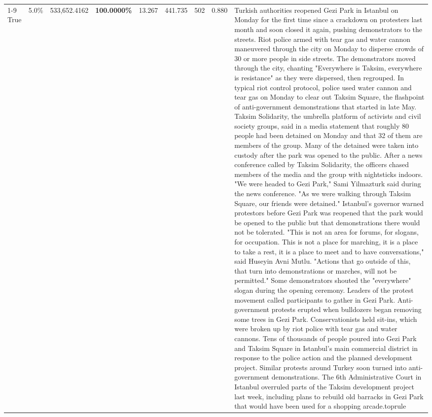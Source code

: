\begin{table}[H]
\begin{tabular}{lllrlllll}
\cline{1-9}
True & 5.0\% & 533,652.4162 & \bfseries \color{red} 100.0000\% & 13.267 & 441.735 & 502 & 0.880 & Turkish authorities reopened Gezi Park in Istanbul on Monday for the first time since a crackdown on protesters last month and soon closed it again, pushing demonstrators to the streets. Riot police armed with tear gas and water cannon maneuvered through the city on Monday to disperse crowds of 30 or more people in side streets. The demonstrators moved through the city, chanting "Everywhere is Taksim, everywhere is resistance" as they were dispersed, then regrouped. In typical riot control protocol, police used water cannon and tear gas on Monday to clear out Taksim Square, the flashpoint of anti-government demonstrations that started in late May. Taksim Solidarity, the umbrella platform of activists and civil society groups, said in a media statement that roughly 80 people had been detained on Monday and that 32 of them are members of the group. Many of the detained were taken into custody after the park was opened to the public. After a news conference called by Taksim Solidarity, the officers chased members of the media and the group with nightsticks indoors. "We were headed to Gezi Park," Sami Yilmazturk said during the news conference. "As we were walking through Taksim Square, our friends were detained." Istanbul's governor warned protestors before Gezi Park was reopened that the park would be opened to the public but that demonstrations there would not be tolerated. "This is not an area for forums, for slogans, for occupation. This is not a place for marching, it is a place to take a rest, it is a place to meet and to have conversations," said Huseyin Avni Mutlu. "Actions that go outside of this, that turn into demonstrations or marches, will not be permitted." Some demonstrators shouted the "everywhere" slogan during the opening ceremony. Leaders of the protest movement called participants to gather in Gezi Park. Anti-government protests erupted when bulldozers began removing some trees in Gezi Park. Conservationists held sit-ins, which were broken up by riot police with tear gas and water cannons. Tens of thousands of people poured into Gezi Park and Taksim Square in Istanbul's main commercial district in response to the police action and the planned development project. Similar protests around Turkey soon turned into anti-government demonstrations. The 6th Administrative Court in Istanbul overruled parts of the Taksim development project last week, including plans to rebuild old barracks in Gezi Park that would have been used for a shopping arcade.toprule \\

\end{tabular}
\end{table}
